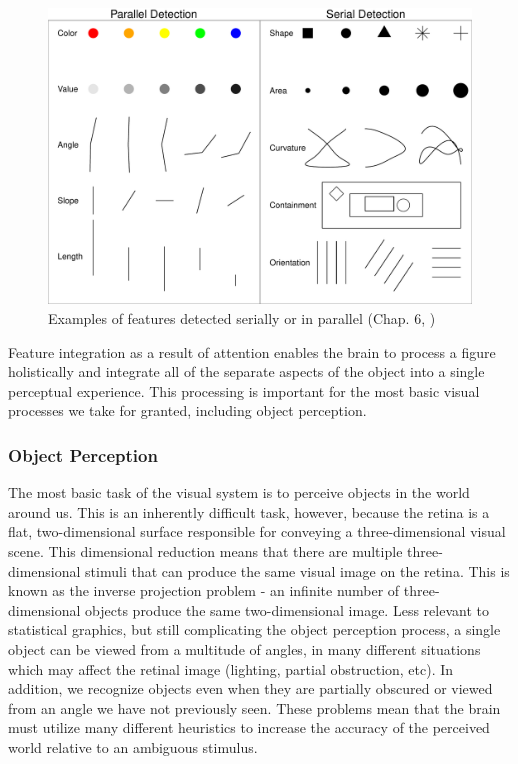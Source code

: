 \documentclass[11pt]{isuthesis}\usepackage[]{graphicx}\usepackage[]{color}
\newenvironment{knitrout}{}{} %
\begin{document}
\begin{figure}[htbp]\centering
\begin{knitrout}
\color{fgcolor}

{\centering \includegraphics[width=.9\linewidth]{Figure/LitReview/fig-parallel-serial-1} 

}



\end{knitrout}
\caption[Parallel and serial feature detection]{Examples of features detected serially or in parallel (Chap. 6, \protect\citealt{helander1997handbook})}\label{fig:parallelSerialFeatures}
\end{figure}

Feature integration as a result of attention enables the brain to process a figure holistically and integrate all of the separate aspects of the object into a single perceptual experience. This processing is important for the most basic visual processes we take for granted, including object perception. 

\subsubsection{Object Perception} \label{ObjectPerception}
The most basic task of the visual system is to perceive objects in the world around us. This is an inherently difficult task, however, because the retina is a flat, two-dimensional surface responsible for conveying a three-dimensional visual scene. This dimensional reduction means that there are multiple three-dimensional stimuli that can produce the same visual image on the retina. This is known as the inverse projection problem - an infinite number of three-dimensional objects produce the same two-dimensional image. Less relevant to statistical graphics, but still complicating the object perception process, a single object can be viewed from a multitude of angles, in many different situations which may affect the retinal image (lighting, partial obstruction, etc). In addition, we recognize objects even when they are partially obscured or viewed from an angle we have not previously seen. These problems mean that the brain must utilize many different heuristics to increase the accuracy of the perceived world relative to an ambiguous stimulus. 
\end{document}
